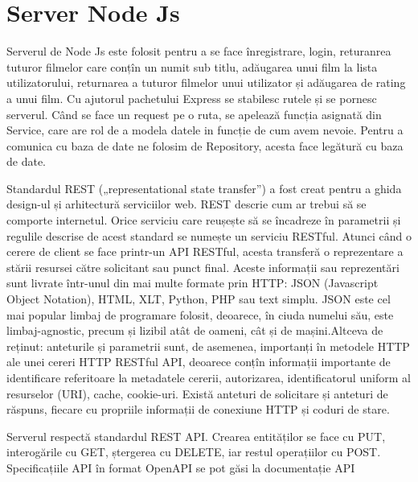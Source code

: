 \section{Server Node Js}
\label{sec:ch5sec1}

\par Serverul de Node Js este folosit pentru a se face înregistrare, login, returanrea tuturor filmelor care conțîn un numit sub titlu, adăugarea unui film la lista utilizatorului, returnarea a tuturor filmelor unui utilizator și adăugarea de rating a unui film. Cu ajutorul pachetului Express se stabilesc rutele și se pornesc serverul. Când se face un request pe o ruta, se apelează funcția asignată din Service, care are rol de a modela datele in funcție de cum avem nevoie. Pentru a comunica cu baza de date ne folosim de Repository, acesta face legătură cu baza de date.

\par Standardul REST („representational state transfer”) a fost creat pentru a ghida design-ul și arhitectură serviciilor web. REST descrie cum ar trebui să se comporte internetul. Orice serviciu care reușește să se încadreze în parametrii și regulile descrise de acest standard se numește un serviciu RESTful.  Atunci când o cerere de client se face printr-un API RESTful, acesta transferă o reprezentare a stării resursei către solicitant sau punct final. Aceste informații sau reprezentări sunt livrate într-unul din mai multe formate prin HTTP: JSON (Javascript Object Notation), HTML, XLT, Python, PHP sau text simplu. JSON este cel mai popular limbaj de programare folosit, deoarece, în ciuda numelui său, este limbaj-agnostic, precum și lizibil atât de oameni, cât și de mașini.Altceva de reținut: anteturile și parametrii sunt, de asemenea, importanți în metodele HTTP ale unei cereri HTTP RESTful API, deoarece conțîn informații importante de identificare referitoare la metadatele cererii, autorizarea, identificatorul uniform al resurselor (URI), cache, cookie-uri. Există anteturi de solicitare și anteturi de răspuns, fiecare cu propriile informații de conexiune HTTP și coduri de stare.

\par Serverul respectă standardul REST API. Crearea entităților se face cu PUT, interogările cu GET, ștergerea cu DELETE, iar restul operațiilor cu POST. Specificațiile API în format OpenAPI se pot găsi la documentație API

